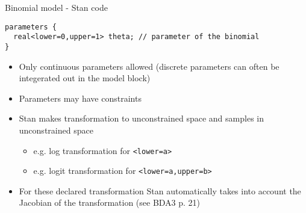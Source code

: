 \documentclass[finnish,english,t]{beamer}
\begin{document}
\begin{frame}[fragile]{Binomial model - Stan code}

  {\small
\begin{verbatim}
parameters {
  real<lower=0,upper=1> theta; // parameter of the binomial
}
\end{verbatim}
  }

  \begin{itemize}
  \item Only continuous parameters allowed (discrete parameters can
    often be integerated out in the model block)
  \item Parameters may have constraints
  \item Stan makes transformation to unconstrained space and samples in unconstrained space
    \begin{itemize}
    \item e.g. log transformation for \texttt{<lower=a>}
    \item e.g. logit transformation for \texttt{<lower=a,upper=b>}
    \end{itemize}
  \item<2-> For these declared transformation Stan automatically takes
    into account the Jacobian of the transformation (see BDA3 p. 21)
  \end{itemize}
\end{frame}
\end{document}

